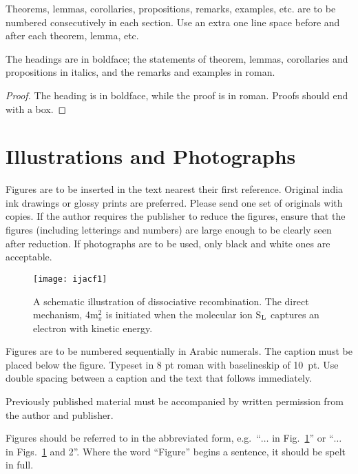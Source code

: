 \documentclass{ws-ijac}
\begin{document}
\begin{theorem}
Theorems, lemmas, corollaries, propositions, remarks,
examples, etc. are to be numbered consecutively in each section.
Use an extra one line space before and after each theorem,
lemma, etc.
\end{theorem}

\begin{lemma}
The headings are in boldface; the statements of theorem,
lemmas, corollaries and propositions in italics, and the
remarks and examples in roman.
\end{lemma}

\begin{proof}
The heading is in boldface, while the proof is in roman.
Proofs should end with a box.
\end{proof}

\section{Illustrations and Photographs}
Figures are to be inserted in the text nearest their first reference.
Original india ink drawings or glossy prints are preferred. Please
send one set of originals with copies. If the author requires the
publisher to reduce the figures, ensure that the figures (including
letterings and numbers) are large enough to be clearly seen after
reduction. If photographs are to be used, only black and white ones
are acceptable.

\begin{figure}[ph]
\centerline{\texttt{[image: ijacf1]}}
\vspace*{8pt}
\caption{A schematic illustration of dissociative recombination. The
direct mechanism, 4m$^2_\pi$ is initiated when the
molecular ion S$_{\rm L}$ captures an electron with
kinetic energy.\label{fig1}}
\end{figure}

Figures are to be numbered sequentially in Arabic numerals. The
caption must be placed below the figure. Typeset in 8 pt roman with
baselineskip of 10~pt. Use double spacing between a caption and the text
that follows immediately.

Previously published material must be accompanied by written
permission from the author and publisher.

Figures should be referred to in the abbreviated form,
e.g.~``$\ldots$ in Fig.~\ref{fig1}'' or ``$\ldots$ in
Figs.~\ref{fig1} and 2''. Where the word ``Figure'' begins a
sentence, it should be spelt in full.
\end{document}
